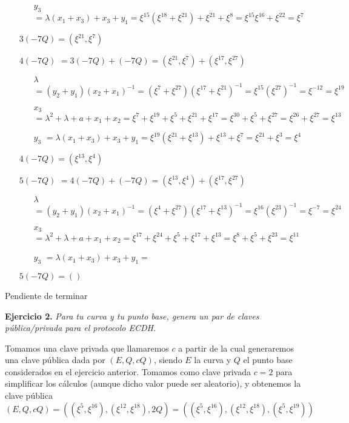 \documentclass[fleqn]{article}
\begin{document}
\begin{itemize}
\begin{itemize}
                \item[$y_3$] $ = \lambda(x_1 + x_3) + x_3 + y_1 = \xi^{15} (\xi^{18} + \xi^{21}) + \xi^{21} + \xi^{8} = \xi^{15}\xi^{16} + \xi^{22} = \xi^{7}$
            \end{itemize}
            $3(-7Q) = (\xi^{21}, \xi^{7})$
        \item[$4(-7Q)$] $ = 3(-7Q) + (-7Q) = (\xi^{21}, \xi^{7}) + (\xi^{17}, \xi^{27})$
            \begin{itemize}
                \item[$\lambda$] $ = (y_2 + y_1)(x_2 + x_1)^{-1} = (\xi^{7} + \xi^{27}) (\xi^{17} + \xi^{21})^{-1} = \xi^{15} (\xi^{27})^{-1} = \xi^{-12} = \xi^{19}$
                \item[$x_3$] $ = \lambda^2 + \lambda + a + x_1 + x_2 = \xi^{7} + \xi^{19} + \xi^{5} + \xi^{21} + \xi^{17} = \xi^{30} + \xi^{5} + \xi^{27} = \xi^{26} + \xi^{27} = \xi^{13}$
                \item[$y_3$] $ = \lambda(x_1 + x_3) + x_3 + y_1 = \xi^{19} (\xi^{21} + \xi^{13}) + \xi^{13} + \xi^{7} = \xi^{21} + \xi^{3} = \xi^{4}$
            \end{itemize}
            $4(-7Q) = (\xi^{13}, \xi^{4})$
        \item[$5(-7Q)$] $ = 4(-7Q) + (-7Q) = (\xi^{13}, \xi^{4}) + (\xi^{17}, \xi^{27})$
            \begin{itemize}
                \item[$\lambda$] $ = (y_2 + y_1)(x_2 + x_1)^{-1} = (\xi^{4} + \xi^{27}) (\xi^{17} + \xi^{13})^{-1} = \xi^{16} (\xi^{23})^{-1} = \xi^{-7} = \xi^{24}$
                \item[$x_3$] $ = \lambda^2 + \lambda + a + x_1 + x_2 = \xi^{17} + \xi^{24} + \xi^{5} + \xi^{17} + \xi^{13} = \xi^{8} + \xi^{5} + \xi^{23} = \xi^{11}$
                \item[$y_3$] $ = \lambda(x_1 + x_3) + x_3 + y_1 = $
            \end{itemize}
            $5(-7Q) = ()$

    \end{itemize}

    Pendiente de terminar



    \newpage
    \textbf{Ejercicio 2. }\textit{Para tu curva y tu punto base, genera un par de claves pública/privada para el protocolo ECDH.}
    \vspace{0.5cm}

    Tomamos una clave privada que llamaremos $c$ a partir de la cual generaremos una clave pública dada por $(E, Q, cQ)$, siendo $E$ la curva
    y $Q$ el punto base considerados en el ejercicio anterior. Tomamos como clave privada $c = 2$ para simplificar los cálculos (aunque dicho valor puede ser aleatorio), 
    y obtenemos la clave pública 
    $$(E, Q, cQ) = ((\xi^5, \xi^{16}), (\xi^{12}, \xi^{18}), 2Q) = ((\xi^5, \xi^{16}), (\xi^{12}, \xi^{18}), (\xi^{5}, \xi^{19}))$$
\end{document}
